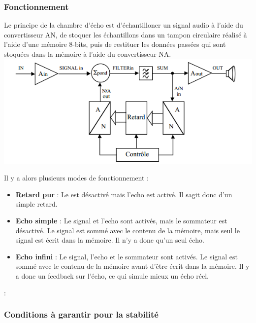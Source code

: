 \documentclass{article}
\begin{document}
\subsubsection{Fonctionnement}
Le principe de la chambre d'écho est d'échantilloner un signal audio à l'aide du convertisseur AN, de stoquer les échantillons dans un tampon circulaire réalisé à l'aide d'une mémoire 8-bits, puis de restituer les données passées qui sont stoquées dans la mémoire à l'aide du convertisseur NA.\\
\includegraphics{principe_chambre_d'echo.png}

Il y a alors plusieurs modes de fonctionnement :
\begin{itemize}
\item \textbf{Retard pur} : Le  est désactivé mais l'echo est activé. Il sagit donc d'un simple retard.
\item \textbf{Echo simple} : Le signal et l'echo sont activés, mais le sommateur est désactivé. Le signal est sommé avec le contenu de la mémoire, mais seul le signal est écrit dans la mémoire. Il n'y a donc qu'un seul écho.
\item \textbf{Echo infini} : Le signal, l'echo et le sommateur sont activés. Le signal est sommé avec le contenu de la mémoire avant d'être écrit dans la mémoire. Il y a donc un feedback sur l'écho, ce qui simule mieux un écho réel.
\end{itemize} :

\subsubsection{Conditions à garantir pour la stabilité}
\end{document}
